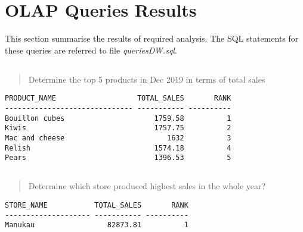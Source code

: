 \documentclass[
  a4paper,
]{article}
\newcommand{\sqloutputbegin}[1][SQL Output]{
        \hspace{0.5cm}
        \begin{minipage}[c]{0.93\linewidth} 
        \centering
        \begin{tcolorbox}[colback=gray!8, colframe=white,
            boxrule=0pt, coltitle=black,
            colbacktitle=gray!15, title={#1}]
        \centering
        \small}
\newcommand{\sqloutputend}{
        \end{tcolorbox} 
        \end{minipage}}
\begin{document}
\hypertarget{olap-queries-results}{%
\section{OLAP Queries Results}\label{olap-queries-results}}

This section summarise the results of required analysis. The SQL
statements for these queries are referred to file \emph{queriesDW.sql}.

\let\oldsubsection\thesubsection
\renewcommand*{\thesubsection}{Question~\arabic{subsection}}

\hypertarget{section}{%
\subsection{}\label{section}}

\begin{quote}
Determine the top 5 products in Dec 2019 in terms of total sales
\end{quote}

\sqloutputbegin

\begin{verbatim}
PRODUCT_NAME                   TOTAL_SALES       RANK
------------------------------ ----------- ----------
Bouillon cubes                     1759.58          1
Kiwis                              1757.75          2
Mac and cheese                        1632          3
Relish                             1574.18          4
Pears                              1396.53          5
\end{verbatim}

\sqloutputend

\hypertarget{section-1}{%
\subsection{}\label{section-1}}

\begin{quote}
Determine which store produced highest sales in the whole year?
\end{quote}

\sqloutputbegin

\begin{verbatim}
STORE_NAME           TOTAL_SALES       RANK
-------------------- ----------- ----------
Manukau                 82873.81          1
\end{verbatim}

\sqloutputend

\hypertarget{section-2}{%
\subsection{}\label{section-2}}
\end{document}
